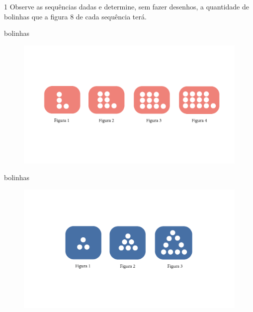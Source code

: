 
\num{1} Observe as sequências dadas e determine, sem fazer desenhos, a
quantidade de bolinhas que a figura 8 de cada sequência terá.

\begin{escolha}
\item\preencher{} bolinhas

\begin{figure}[htpb!]
\includegraphics[width=\textwidth]{../ilustracoes/MAT5/SAEB_5ANO_MAT_figura23.png}
\end{figure}



\item\preencher{} bolinhas

\begin{figure}[htpb!]
\includegraphics[width=\textwidth]{../ilustracoes/MAT5/SAEB_5ANO_MAT_figura24.png}
\end{figure}



\end{escolha}
